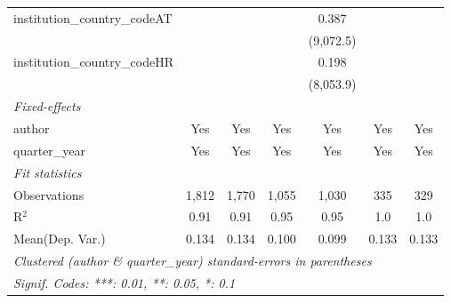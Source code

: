 \begin{tabular}{lcccccc}
   institution\_country\_codeAT          &               &                &               & 0.387         &                &   \\   
                                         &               &                &               & (9,072.5)     &                &   \\   
   institution\_country\_codeHR          &               &                &               & 0.198         &                &   \\   
                                         &               &                &               & (8,053.9)     &                &   \\   
   \midrule
   \emph{Fixed-effects}\\
   author                                & Yes           & Yes            & Yes           & Yes           & Yes            & Yes\\  
   quarter\_year                         & Yes           & Yes            & Yes           & Yes           & Yes            & Yes\\  
   \midrule
   \emph{Fit statistics}\\
   Observations                          & 1,812         & 1,770          & 1,055         & 1,030         & 335            & 329\\  
   R$^2$                                 & 0.91          & 0.91           & 0.95          & 0.95          & 1.0            & 1.0\\  
Mean(Dep. Var.) & 0.134 & 0.134 & 0.100 & 0.099 & 0.133 & 0.133 \\
   \midrule \midrule
   \multicolumn{7}{l}{\emph{Clustered (author \& quarter\_year) standard-errors in parentheses}}\\
   \multicolumn{7}{l}{\emph{Signif. Codes: ***: 0.01, **: 0.05, *: 0.1}}\\
\end{tabular}
\par\endgroup

